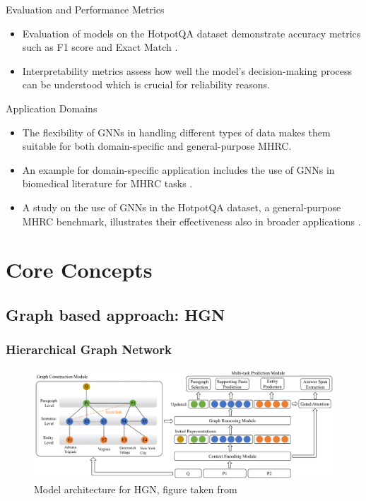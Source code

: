 \documentclass[10pt]{beamer}
\begin{document}
\begin{frame}[fragile]{Evaluation and Performance Metrics}
  \begin{itemize}
    \item Evaluation of models on the HotpotQA dataset demonstrate accuracy metrics such as F1 score and Exact Match \cite{RN116}.
    \item Interpretability metrics assess how well the model's decision-making process can be understood which is crucial for reliability reasons.
  \end{itemize}
\end{frame}

\begin{frame}[fragile]{Application Domains}
  \begin{itemize}
    \item The flexibility of GNNs in handling different types of data makes them suitable for both domain-specific and general-purpose MHRC.
    \item An example for domain-specific application includes the use of GNNs in biomedical literature for MHRC tasks \cite{RN129}.
    \item A study on the use of GNNs in the HotpotQA dataset, a general-purpose MHRC benchmark, illustrates their effectiveness also in broader applications \cite{RN116}.
  \end{itemize}
\end{frame}

\section{Core Concepts}

\subsection{Graph based approach: HGN}

\begin{frame}
  \frametitle{Hierarchical Graph Network}

  \begin{figure}[t] %
    \centering
    \includegraphics[width=\linewidth]{fig/ext_fig/hgn_diagram.png} %
    \caption{Model architecture for HGN, figure taken from \cite{RN119}}
    \label{fig:sample_hotpotqa} %
  \end{figure}

\end{frame}
\end{document}
